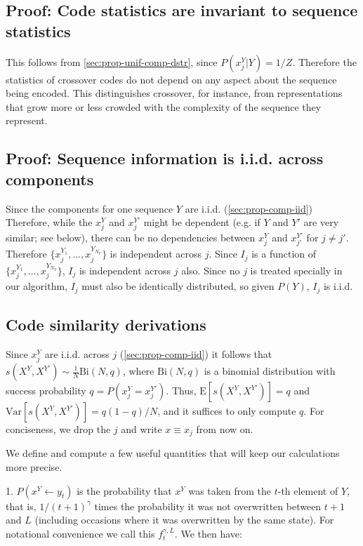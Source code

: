 \documentclass{article}
\begin{document}
\subsection{Proof: Code statistics are invariant to sequence statistics}

This follows from \ref{sec:prop-unif-comp-dstr}, since $P(x^Y_j|Y) = 1/Z$. Therefore the statistics of crossover codes do not depend on any aspect about the sequence being encoded. This distinguishes crossover, for instance, from representations that grow more or less crowded with the complexity of the sequence they represent.

\subsection{Proof: Sequence information is i.i.d. across components}

Since the components for one sequence $Y$ are i.i.d. (\ref{sec:prop-comp-iid}) Therefore, while the $x^Y_j$ and $x^{Y'}_j$ might be dependent (e.g. if $Y$ and $Y'$ are very similar; see below), there can be no dependencies between $x^Y_j$ and $x^{Y'}_{j'}$ for $j \neq j'$. Therefore $\{x^{Y_1}_j, ..., x^{Y_{N_Y}}_j\}$ is independent across $j$. Since $I_j$ is a function of $\{x^{Y_1}_j, ..., x^{Y_{N_Y}}_j\}$, $I_j$ is independent across $j$ also. Since no $j$ is treated specially in our algorithm, $I_j$ must also be identically distributed, so given $P(Y)$, $I_j$ is i.i.d.

\subsection{Code similarity derivations}

Since $x^Y_j$ are i.i.d. across $j$ (\ref{sec:prop-comp-iid}) it follows that $s(X^Y, X^{Y'}) \sim \frac{1}{N}\textrm{Bi}(N, q)$, where $\textrm{Bi}(N, q)$ is a binomial distribution with success probability $q = P(x^Y_j = x^{Y'}_j)$. Thus, $\textrm{E}[s(X^Y, X^{Y'})] = q$ and $\textrm{Var}[s(X^Y, X^{Y'})] = q(1-q)/N$, and it suffices to only compute $q$. For conciseness, we drop the $j$ and write $x \equiv x_j$ from now on.

We define and compute a few useful quantities that will keep our calculations more precise.

1. $P(x^Y \leftarrow y_t)$ is the probability that $x^Y$ was taken from the $t$-th element of $Y$, that is, $1/(t+1)^\gamma$ times the probability it was not overwritten between $t+1$ and $L$ (including occasions where it was overwritten by the same state). For notational convenience we call this $f^{\gamma,L}_t$. We then have:
\end{document}
